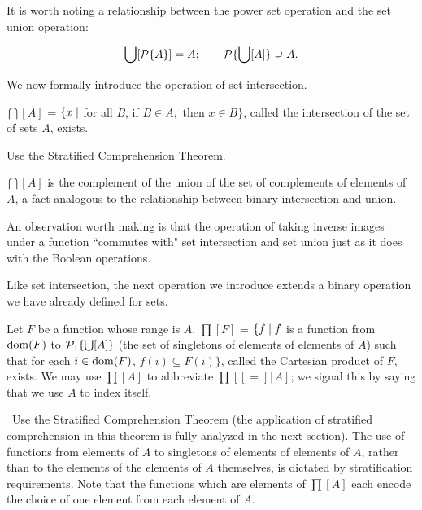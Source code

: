 It is worth noting a relationship between the power set
operation and the set union operation:

\begin{displaymath}
 \bigcup[{\cal P}\{A\}] = A;\qquad
 {\cal P}\{\bigcup[A]\} \supseteq A.
\end{displaymath}

We now formally introduce the operation of set intersection.

\begin{thm}
 $\bigcap[A]$ = $\{x \mid$ for all $B$, if $B \in A,$
 then $ x \in B\}$, called the
 {\upshape intersection of the set of sets $A$}, exists.
\end{thm}

\preuve Use the Stratified Comprehension Theorem.
\finpreuve

$\bigcap [A]$ is the complement of the union
of the set of complements of elements of $A$, a fact analogous to the
relationship between binary intersection and union.  

An observation worth making is that the operation of taking
inverse images under a function ``commutes
with" set intersection and set union just as it
does with the Boolean operations.


Like set intersection, the next operation we introduce extends
a binary operation we have already defined for sets.

\begin{thm}
 Let $F$ be a function whose range is $A$.  $\prod[F]$ = $\{f
 \mid f$ is a function from $\mathop{\mathrm{dom}}(F)$ to ${\cal P}_1\{\bigcup[A]\}$ (the set of
 singletons of elements of elements of $A$) such that for each
 $i \in \mathop{\mathrm{dom}}(F)$, $f(i) \subseteq F(i)\}$, called the {\upshape
 Cartesian 
 product} of $F$, exists.  We may use $\prod[A]$ to abbreviate
 $\prod[[=] \lceil A]$; we signal this by saying that we use $A$ to
 index itself.
\end{thm}

\preuve\ Use the Stratified Comprehension Theorem (the application of stratified comprehension in this theorem
is fully analyzed in the next section).  The use of functions 
from elements of $A$ to singletons of elements of
elements of $A$, rather than to the elements of the elements of $A$
themselves, is dictated by stratification
requirements.  Note that the functions which are elements of
$\prod[A]$ each encode the choice of one
element from each element of $A$.
\finpreuve

